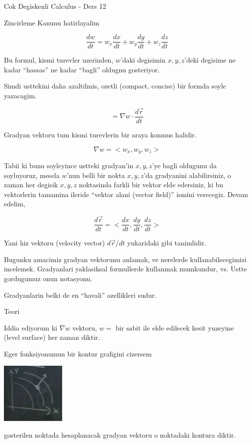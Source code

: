 \documentclass[12pt,fleqn]{article}
\begin{document}
Cok Degiskenli Calculus - Ders 12

Zincirleme Kanunu hatirlayalim

\[ \frac{dw}{dt}  = w_x \frac{dx}{dt} + 
w_y \frac{dy}{dt} + 
w_z \frac{dz}{dt}  \]

Bu formul, kismi turevler uzerinden, $w$'daki degisimin $x,y,z$'deki
degisime ne kadar ``hassas'' ne kadar ``bagli'' oldugnu gosteriyor.

Simdi usttekini daha azaltilmis, ozetli (compact, concise) bir formda soyle
yazacagim. 

\[ = \nabla w \cdot  \frac{d\vec{r}}{dt} \]

Gradyan vektoru tum kismi turevlerin bir araya konmus halidir. 

\[ \nabla w = <w_x, w_y, w_z> \]

Tabii ki bunu soyleyince ustteki gradyan'in $x,y,z$'ye bagli oldugunu da
soyluyoruz, mesela $w$'nun belli bir nokta $x,y,z$'da gradyanini
alabilirsiniz, o zaman her degisik $x,y,z$ noktasinda farkli bir vektor
elde edersiniz, ki bu vektorlerin tamamina ileride ``vektor alani (vector
field)'' ismini verecegiz. Devam edelim, 

\[ \frac{d\vec{r}}{dt} = < \frac{dx}{dt}, \frac{dy}{dt}, \frac{dz}{dt} > \]

Yani hiz vektoru (velocity vector) $d\vec{r}/{dt}$ yukaridaki gibi
tanimlidir.

Bugunku amacimiz gradyan vektorunu anlamak, ve nerelerde
kullanabilecegimizi incelemek. Gradyanlari yaklasiksal formullerde
kullanmak mumkundur, vs. Ustte gordugumuz onun notasyonu. 

Gradyanlarin belki de en ``havali'' ozellikleri sudur. 

Teori

Iddia ediyorum ki $\nabla w$ vektoru, $w = \textrm{ bir sabit }$ile elde
edilecek kesit yuzeyine (level surface) her zaman diktir.

Eger fonksiyonumun bir kontur grafigini cizersem

\includegraphics[height=3cm]{12_1.png}

gosterilen noktada hesaplanacak gradyan vektoru o noktadaki kontura
diktir. 
\end{document}
